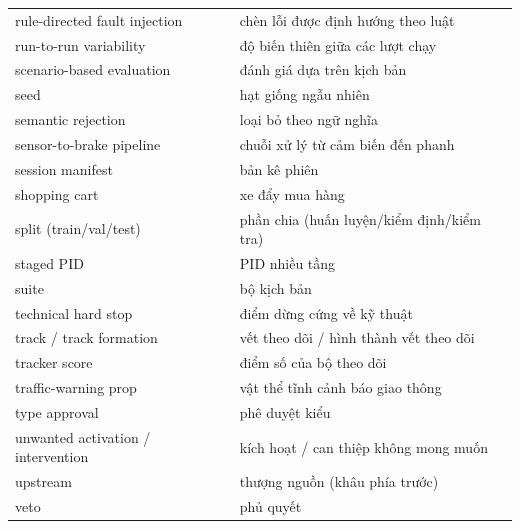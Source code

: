 \documentclass[11pt,a4paper]{article}
\begin{document}
\begin{longtable}{@{}p{}p{}@{}}
rule-directed fault injection & chèn lỗi được định hướng theo luật\\
run-to-run variability & độ biến thiên giữa các lượt chạy\\
scenario-based evaluation & đánh giá dựa trên kịch bản\\
seed & hạt giống ngẫu nhiên\\
semantic rejection & loại bỏ theo ngữ nghĩa\\
sensor-to-brake pipeline & chuỗi xử lý từ cảm biến đến phanh\\
session manifest & bản kê phiên\\
shopping cart & xe đẩy mua hàng\\
split (train/val/test) & phần chia (huấn luyện/kiểm định/kiểm tra)\\
staged PID & PID nhiều tầng\\
suite & bộ kịch bản\\
technical hard stop & điểm dừng cứng về kỹ thuật\\
track / track formation & vết theo dõi / hình thành vết theo dõi\\
tracker score & điểm số của bộ theo dõi\\
traffic-warning prop & vật thể tĩnh cảnh báo giao thông\\
type approval & phê duyệt kiểu\\
unwanted activation / intervention & kích hoạt / can thiệp không mong muốn\\
upstream & thượng nguồn (khâu phía trước)\\
veto & phủ quyết\\
\end{longtable}
\endgroup
\end{document}
